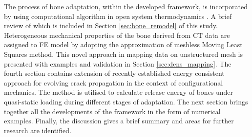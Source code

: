 \documentclass[11pt]{acmeArticle}
\numberwithin{equation}{section}
\begin{document}
The process of bone adaptation, within the developed framework, is incorporated by using computational algorithm in open system thermodynamics \citep{Kuhl2003a}. A brief review of which is included in Section \ref{sec:bone_remodel} of this study. Heterogeneous mechanical properties of the bone derived from CT data are assigned to FE model by adopting the approximation of meshless Moving Least Squares method. This novel approach in mapping data on unstructured mesh is presented with examples and validation in Section \ref{sec:dens_mapping}. The fourth section contains extension of recently established energy consistent approach for evolving crack propagation in the context of configurational mechanics. The method is utilised to calculate release energy of bones under quasi-static loading during different stages of adaptation. The next section brings together all the developments of the framework in the form of numerical examples. Finally, the discussion gives a brief summary and areas for further research are identified.
\end{document}
